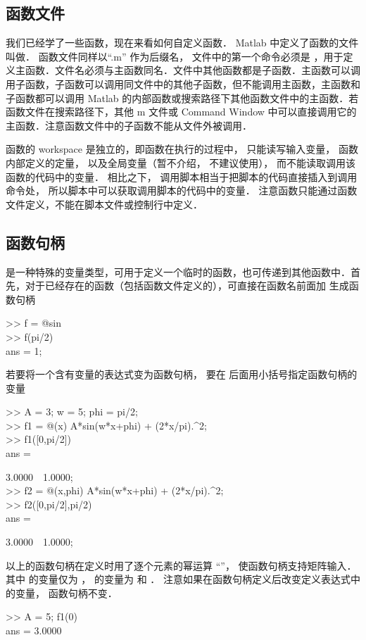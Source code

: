 

\subsection{函数文件}

我们已经学了一些函数，现在来看如何自定义函数． Matlab 中定义了函数的文件叫做． 函数文件同样以“.m” 作为后缀名， 文件中的第一个命令必须是 ，用于定义主函数．文件名必须与主函数同名．文件中其他函数都是子函数．主函数可以调用子函数，子函数可以调用同文件中的其他子函数，但不能调用主函数，主函数和子函数都可以调用 Matlab 的内部函数或搜索路径下其他函数文件中的主函数．若函数文件在搜索路径下，其他 m 文件或 Command Window 中可以直接调用它的主函数．注意函数文件中的子函数不能从文件外被调用．

函数的 workspace 是独立的，即函数在执行的过程中， 只能读写输入变量， 函数内部定义的定量， 以及全局变量（暂不介绍， 不建议使用）， 而不能读取调用该函数的代码中的变量． 相比之下， 调用脚本相当于把脚本的代码直接插入到调用命令处， 所以脚本中可以获取调用脚本的代码中的变量． 注意函数只能通过函数文件定义，不能在脚本文件或控制行中定义．

\subsection{函数句柄}
 是一种特殊的变量类型，可用于定义一个临时的函数，也可传递到其他函数中．首先，对于已经存在的函数（包括函数文件定义的），可直接在函数名前面加  生成函数句柄
\begin{Command}
>> f = @sin \\
>> f(pi/2) \\
ans = 1;
\end{Command}
若要将一个含有变量的表达式变为函数句柄， 要在  后面用小括号指定函数句柄的变量
\begin{Command}
>> A = 3; w = 5; phi = pi/2; \\
>> f1 = @(x) A*sin(w*x+phi) + (2*x/pi).\^{}2; \\
>> f1([0,pi/2]) \\
ans = \par
3.0000\ \ 1.0000; \\
>> f2 = @(x,phi) A*sin(w*x+phi) + (2*x/pi).\^{}2; \\
>> f2([0,pi/2],pi/2) \\
ans = \par
3.0000\ \ 1.0000;
\end{Command}
以上的函数句柄在定义时用了逐个元素的幂运算 “”， 使函数句柄支持矩阵输入． 其中  的变量仅为 ，  的变量为  和 ． 注意如果在函数句柄定义后改变定义表达式中的变量， 函数句柄不变．
\begin{Command}
>> A = 5; f1(0)\\
ans = 3.0000
\end{Command}

